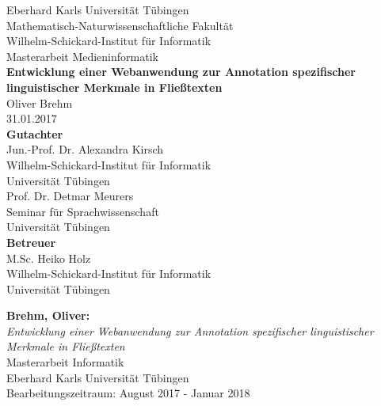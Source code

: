 \documentclass[twoside,12pt,a4paper]{scrreprt}
\begin{document}
\begin{titlepage}
\begin{center}
\LARGE Eberhard Karls Universität Tübingen\\
\large Mathematisch-Naturwissenschaftliche Fakultät \\
Wilhelm-Schickard-Institut für Informatik\\
[3cm]
\huge Masterarbeit Medieninformatik\\
[2cm]
\Large\textbf{Entwicklung einer Webanwendung zur Annotation spezifischer linguistischer Merkmale in Fließtexten}\\
[1.5cm]
\large Oliver Brehm\\
[0.5cm]
31.01.2017\\
\vfill
\small\textbf{Gutachter}\\[0.3cm]

\large Jun.-Prof. Dr. Alexandra Kirsch\\
\footnotesize Wilhelm-Schickard-Institut für Informatik\\Universität Tübingen\\
[0.5cm]

\large Prof. Dr. Detmar Meurers\\
\footnotesize Seminar für Sprachwissenschaft\\Universität Tübingen\\
[1cm]

\small\textbf{Betreuer}\\[0.3cm]
\large M.Sc. Heiko Holz\\
\footnotesize Wilhelm-Schickard-Institut für Informatik\\Universität Tübingen
\end{center}
\end{titlepage}

\thispagestyle{empty}
\vspace*{\fill}
\textbf{Brehm, Oliver:}\\
\emph{Entwicklung einer Webanwendung zur Annotation spezifischer linguistischer Merkmale in Fließtexten}\\
Masterarbeit Informatik\\
Eberhard Karls Universität Tübingen\\
Bearbeitungszeitraum: August 2017 - Januar 2018
\newpage


\newpage

\tableofcontents\label{toc}
\listoffigures
\listoftables
\cleardoublepage
\end{document}
